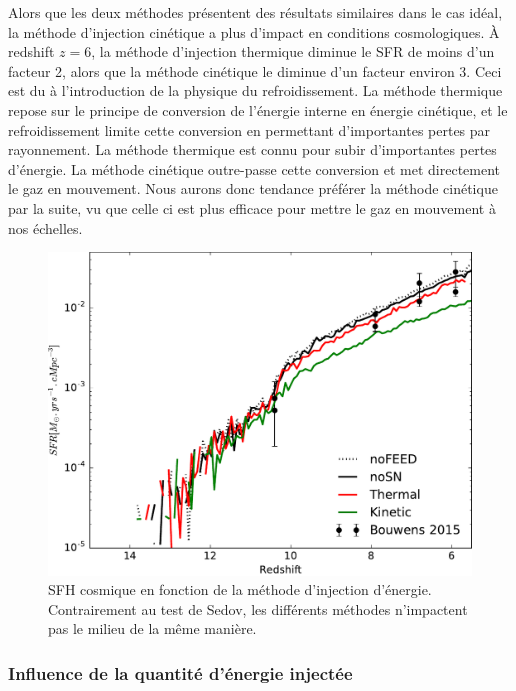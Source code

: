 Alors que les deux méthodes présentent des résultats similaires dans le cas idéal, la méthode d'injection cinétique a plus d'impact en conditions cosmologiques.
À redshift $z=6$, la méthode d'injection thermique diminue le \ac{SFR} de moins d'un facteur 2, alors que la méthode cinétique le diminue d'un facteur environ 3.
Ceci est du à l'introduction de la physique du refroidissement.
La méthode thermique repose sur le principe de conversion de l'énergie interne en énergie cinétique, et le refroidissement limite cette conversion en permettant d'importantes pertes par rayonnement.
La méthode thermique est connu \citep{navarro_simulations_1993} pour subir d'importantes pertes d'énergie.
La méthode cinétique outre-passe cette conversion et met directement le gaz en mouvement.
Nous aurons donc tendance préférer la méthode cinétique par la suite, vu que celle ci est plus efficace pour mettre le gaz en mouvement à nos échelles.


\begin{figure}
        \includegraphics[width=.95\textwidth]{img/03/sedov/SFRmethode.pdf} 
        \caption[SFH cosmique en fonction de la méthode d'injection d'énergie]{SFH cosmique en fonction de la méthode d'injection d'énergie.
        Contrairement au test de Sedov, les différents méthodes n'impactent pas le milieu de la même manière.
        }
 		\label{fig:sfr_methode}
\end{figure}



\subsubsection{Influence de la quantité d'énergie injectée}
\label{sec:snegy}

